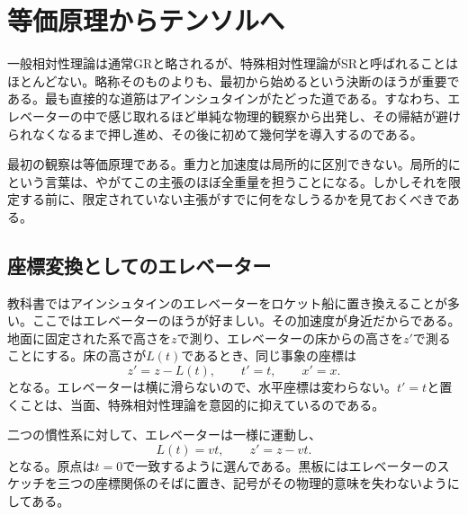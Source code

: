 \chapter{等価原理からテンソルへ}

一般相対性理論は通常GRと略されるが、特殊相対性理論がSRと呼ばれることはほとんどない。略称そのものよりも、最初から始めるという決断のほうが重要である。最も直接的な道筋はアインシュタインがたどった道である。すなわち、エレベーターの中で感じ取れるほど単純な物理的観察から出発し、その帰結が避けられなくなるまで押し進め、その後に初めて幾何学を導入するのである。

最初の観察は等価原理である。重力と加速度は局所的に区別できない。局所的にという言葉は、やがてこの主張のほぼ全重量を担うことになる。しかしそれを限定する前に、限定されていない主張がすでに何をなしうるかを見ておくべきである。

\section{座標変換としてのエレベーター}

教科書ではアインシュタインのエレベーターをロケット船に置き換えることが多い。ここではエレベーターのほうが好ましい。その加速度が身近だからである。地面に固定された系で高さを\(z\)で測り、エレベーターの床からの高さを\(z'\)で測ることにする。床の高さが\(L(t)\)であるとき、同じ事象の座標は
\begin{equation}
 z'=z-L(t),\qquad t'=t,\qquad x'=x.
\label{eq:elevator-map}
\end{equation}
となる。エレベーターは横に滑らないので、水平座標は変わらない。\(t'=t\)と置くことは、当面、特殊相対性理論を意図的に抑えているのである。

\begin{classroomqa}
\end{classroomqa}

二つの慣性系に対して、エレベーターは一様に運動し、
\begin{equation}
 L(t)=vt,\qquad z'=z-vt.
\label{eq:galilean-elevator}
\end{equation}
となる。原点は\(t=0\)で一致するように選んである。黒板にはエレベーターのスケッチを三つの座標関係のそばに置き、記号がその物理的意味を失わないようにしてある。

